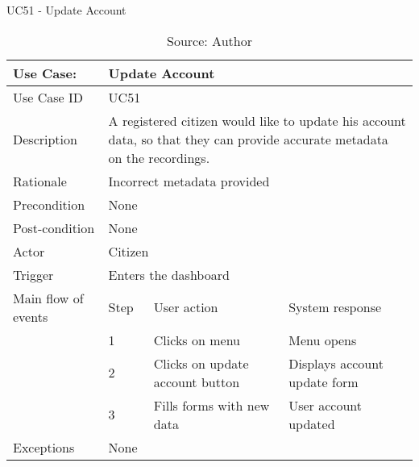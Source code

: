 \begin{table}[h]
\centering
\caption{UC51 - Update Account}
\label{uc:51}
\begin{tabular}{|p{3cm}|p{1cm}|p{5cm}|p{5cm}|}
\hline
Use Case:       & \multicolumn{3}{p{11cm}|}{Update Account} \\ \hline
Use Case ID     & \multicolumn{3}{p{11cm}|}{UC51} \\ \hline
Description     & \multicolumn{3}{p{11cm}|}{A registered citizen would like to update his account data, so that they can provide accurate metadata on the recordings.} \\ \hline
Rationale       & \multicolumn{3}{p{11cm}|}{Incorrect metadata provided} \\ \hline
Precondition    & \multicolumn{3}{p{11cm}|}{None} \\ \hline
Post-condition  & \multicolumn{3}{p{11cm}|}{None} \\ \hline
Actor           & \multicolumn{3}{p{11cm}|}{Citizen} \\ \hline
Trigger         & \multicolumn{3}{p{11cm}|}{Enters the dashboard} \\ \hline
Main flow of events & Step  & User action & System response \\ \hline
                    & 1     & Clicks on menu & Menu opens \\ \hline
                    & 2     & Clicks on update account button & Displays account update form \\ \hline
                    & 3     & Fills forms with new data & User account updated \\ \hline
Exceptions      & \multicolumn{3}{p{11cm}|}{None} \\ \hline
\end{tabular}
\caption*{Source: Author}
\end{table}

